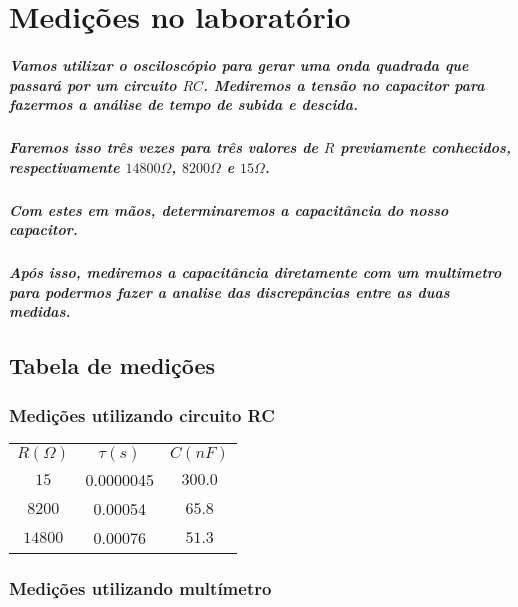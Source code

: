 \documentclass[12pt,twoside, a4paper, twocolumn]{article}
\begin{document}
\section{Medições no laboratório}

\subparagraph*{Vamos utilizar o osciloscópio para gerar uma onda quadrada que passará por um circuito $RC$. Mediremos a tensão no capacitor para fazermos a análise de tempo de subida e descida.}

\subparagraph*{Faremos isso três vezes para três valores de $R$ previamente conhecidos, respectivamente $14800 \varOmega$, $8200 \varOmega$ e $15 \varOmega$.}

\subparagraph*{Com estes em mãos, determinaremos a capacitância do nosso capacitor.}

\subparagraph*{Após isso, mediremos a capacitância diretamente com um multimetro para podermos fazer a analise das discrepâncias entre as duas medidas.}

\subsection{Tabela de medições}

\subsubsection{Medições utilizando circuito RC}

\begin{center}
    \begin{tabular}{ |c|c|c| }
        \hline
        $R (\varOmega)$ & $\tau (s)$ & $C (nF)$ \\
        $15$            & 0.0000045  & $300.0$  \\
        $8200$          & 0.00054    & $65.8$   \\
        $14800$         & 0.00076    & $51.3$   \\
        \hline
    \end{tabular}
\end{center}


\subsubsection{Medições utilizando multímetro}
\end{document}

